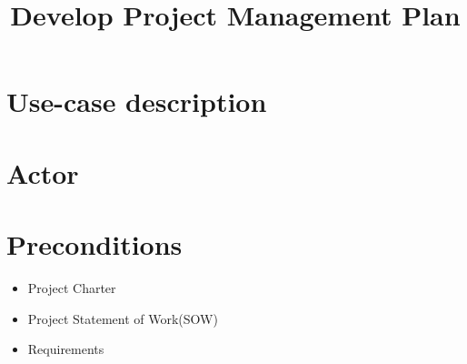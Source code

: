 \documentclass[notitlepage]{article}
\date{}
\author{}
\title{#1}
\newcommand{\name}[1]{%
   \title{#1}
   \maketitle
}
\begin{document}
   \name{Develop Project Management Plan}

\vspace{-2cm}%

\section{Use-case description}

\begin{comment}
	{\noindent Project plan will include the documentation of requirements, defining scope and creating Work Breakdown Structure based on collected requirements.}
\end{comment}


\section{Actor}

\begin{comment}
	{Project Manager/Colleagues }
\end{comment}
\section{Preconditions}

\begin{comment}
	{The following preconditions have to be present:}
\end{comment}

\begin{itemize}
  \item Project Charter
  \item Project Statement of Work(SOW)
  \item Requirements
\end{itemize}
\end{document}
